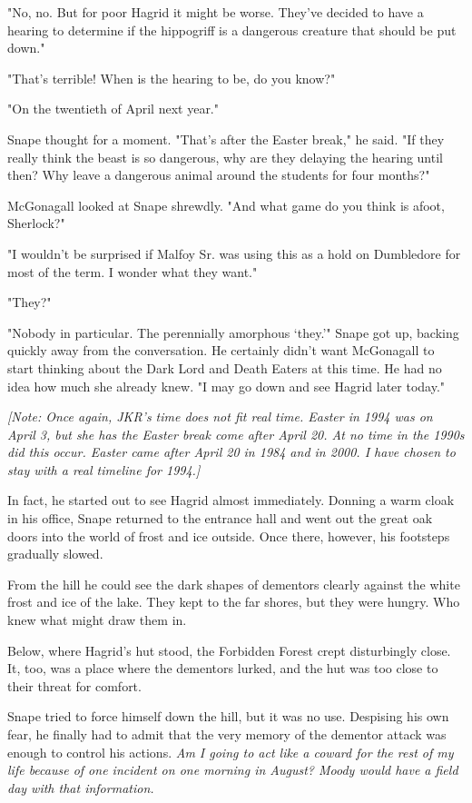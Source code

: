 "No, no. But for poor Hagrid it might be worse. They've decided to have a hearing to determine if the hippogriff is a dangerous creature that should be put down."

"That's terrible! When is the hearing to be, do you know?"

"On the twentieth of April next year."

Snape thought for a moment. "That's after the Easter break," he said. "If they really think the beast is so dangerous, why are they delaying the hearing until then? Why leave a dangerous animal around the students for four months?"

McGonagall looked at Snape shrewdly. "And what game do you think is afoot, Sherlock?"

"I wouldn't be surprised if Malfoy Sr. was using this as a hold on Dumbledore for most of the term. I wonder what they want."

"They?"

"Nobody in particular. The perennially amorphous `they.'" Snape got up, backing quickly away from the conversation. He certainly didn't want McGonagall to start thinking about the Dark Lord and Death Eaters at this time. He had no idea how much she already knew. "I may go down and see Hagrid later today."

\emph{[Note: Once again, JKR's time does not fit real time. Easter in 1994 was on April 3, but she has the Easter break come after April 20. At no time in the 1990s did this occur. Easter came after April 20 in 1984 and in 2000. I have chosen to stay with a real timeline for 1994.]}

\sbreak

In fact, he started out to see Hagrid almost immediately. Donning a warm cloak in his office, Snape returned to the entrance hall and went out the great oak doors into the world of frost and ice outside. Once there, however, his footsteps gradually slowed.

From the hill he could see the dark shapes of dementors clearly against the white frost and ice of the lake. They kept to the far shores, but they were hungry. Who knew what might draw them in.

Below, where Hagrid's hut stood, the Forbidden Forest crept disturbingly close. It, too, was a place where the dementors lurked, and the hut was too close to their threat for comfort.

Snape tried to force himself down the hill, but it was no use. Despising his own fear, he finally had to admit that the very memory of the dementor attack was enough to control his actions. \emph{Am I going to act like a coward for the rest of my life because of one incident on one morning in August? Moody would have a field day with that information.}


